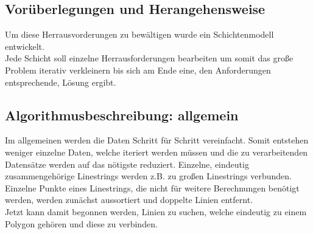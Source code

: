 \documentclass[a4paper, 12pt]{article}
\begin{document}
\subsection{Vorüberlegungen und Herangehensweise}
Um diese Herrausvorderungen zu bewältigen wurde ein Schichtenmodell entwickelt.\\
Jede Schicht soll einzelne Herrausforderungen bearbeiten um somit das große Problem iterativ verkleinern bis sich am Ende eine, den Anforderungen entsprechende, Lösung ergibt.\\
\subsection{Algorithmusbeschreibung: allgemein}
Im allgemeinen werden die Daten Schritt für Schritt vereinfacht. Somit entstehen weniger einzelne Daten, welche iteriert werden müssen und die zu verarbeitenden Datensätze werden auf das nötigste reduziert. Einzelne, eindeutig zusammengehörige Linestrings werden z.B. zu großen Linestrings verbunden. Einzelne Punkte eines Linestrings, die nicht für weitere Berechnungen benötigt werden, werden zunächst aussortiert und doppelte Linien entfernt.\\
Jetzt kann damit begonnen werden, Linien zu suchen, welche eindeutig zu einem Polygon gehören und diese zu verbinden.\\
\end{document}
